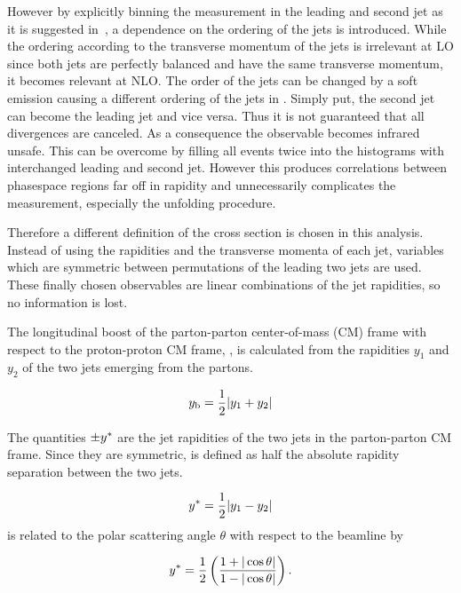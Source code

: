 However by explicitly binning the measurement in the leading and second jet as
it is suggested in~\cite{nigel_theory}, a dependence on the ordering of the jets
is introduced. While the ordering according to the transverse momentum of the
jets is irrelevant at LO since both jets are perfectly balanced and have the
same transverse momentum, it becomes relevant at NLO. The order of the jets can
be changed by a soft emission causing a different ordering of the jets in \pt.
Simply put, the second jet can become the leading jet and vice versa. Thus it is
not guaranteed that all divergences are canceled. As a consequence the
observable becomes infrared unsafe. This can be overcome by filling all events
twice into the histograms with interchanged leading and second jet. However this
produces correlations between phasespace regions far off in rapidity and unnecessarily
complicates the measurement, especially the unfolding procedure.

Therefore a different definition of the cross section is chosen in this
analysis. Instead of using the rapidities and the transverse momenta of each
jet, variables which are symmetric between permutations of the leading two jets
are used. These finally chosen observables are linear combinations of the jet
rapidities, so no information is lost.


The longitudinal boost of the parton-parton center-of-mass (CM) frame with
respect to the proton-proton CM frame, \yboost, is calculated from the
rapidities $y_1$ and $y_2$ of the two jets emerging from the partons. 

\begin{equation*}
    y_{\mathrm{b}} = \frac{1}{2} |y_1 + y_2|
\end{equation*}

The quantities $\pm y^*$ are the jet rapidities of the two jets in the
parton-parton CM frame. Since they are symmetric, \ystar is defined as half the
absolute rapidity separation between the two jets.

\begin{equation*}
    y^* = \frac{1}{2} |y_1 - y_2|
\end{equation*}
\ystar is related to the polar scattering angle $\theta$ with respect to the
beamline by 

\begin{equation*}
    y^* = \frac{1}{2} \left( \frac{1 + |\cos \theta|}{1- | \cos \theta|} \right).
\end{equation*}

